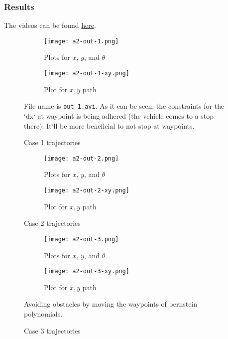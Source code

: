 \subsubsection{Results}

The videos can be found \href{https://iiitaphyd-my.sharepoint.com/:f:/g/personal/avneesh_mishra_research_iiit_ac_in/EogE243Ab4lDvm5VSueCLY8B7tLHOWnVw8i8PQnv5Bndfg?e=k8xJ1n}{here}.

\begin{figure}[ht]
    \centering
    \begin{subfigure}[b]{0.3\textwidth}
        \texttt{[image: a2-out-1.png]}
        \caption{Plots for $x$, $y$, and $\theta$}
    \end{subfigure}
    \begin{subfigure}[b]{0.6\textwidth}
        \texttt{[image: a2-out-1-xy.png]}
        \caption{Plot for $x, y$ path}
    \end{subfigure}
    \caption{Case 1 trajectories}
    \label{fig:case-1-traj}
    \small
        File name is \texttt{out\_1.avi}. As it can be seen, the constraints for the `dx` at waypoint is being adhered (the vehicle comes to a stop there). It'll be more beneficial to not stop at waypoints.
\end{figure}

\begin{figure}
    \centering
    \begin{subfigure}[b]{0.25\textwidth}
        \texttt{[image: a2-out-2.png]}
        \caption{Plots for $x$, $y$, and $\theta$}
    \end{subfigure}
    \begin{subfigure}[b]{0.5\textwidth}
        \texttt{[image: a2-out-2-xy.png]}
        \caption{Plot for $x, y$ path}
    \end{subfigure}
    \caption{Case 2 trajectories}
    \label{fig:case-2-traj}
\end{figure}

\begin{figure}
    \centering
    \begin{subfigure}[b]{0.25\textwidth}
        \texttt{[image: a2-out-3.png]}
        \caption{Plots for $x$, $y$, and $\theta$}
    \end{subfigure}
    \begin{subfigure}[b]{0.5\textwidth}
        \texttt{[image: a2-out-3-xy.png]}
        \caption{Plot for $x, y$ path}
    \end{subfigure}
    \caption{Case 3 trajectories}
    \label{fig:case-3-traj}
    \small
        Avoiding obstacles by moving the waypoints of bernstein polynomials.
\end{figure}

